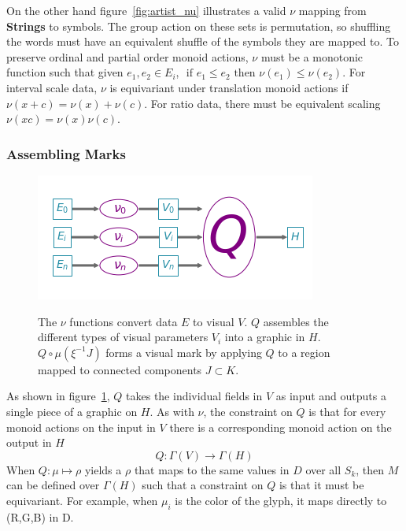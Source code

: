 \documentclass[../main.tex]{subfiles}
\begin{document}
On the other hand figure~\ref{fig:artist_nu} illustrates a valid $\nu$ mapping from \textbf{Strings} to symbols. The group action on these sets is permutation, so shuffling the words must have an equivalent shuffle of the symbols they are mapped to. To preserve ordinal and partial order monoid actions, $\nu$ must be a monotonic function such that given $e_1, e_2 \in E_{i}$, $\text{ if } e_1 \leq e_2 \text{ then } \nu(e_1) \leq \nu(e_2)$. For interval scale data, $\nu$ is equivariant under translation monoid actions if $\nu(x + c) = \nu(x) + \nu(c)$. For ratio data, there must be equivalent scaling $ \nu(xc) = \nu(x)\nu(c)$.

\subsubsection{Assembling Marks}
\label{sec:artist_q}
\begin{figure}[H]
    \includegraphics[width=\textwidth]{figures/math/path_of_q}
    \label{fig:artist_q}
    \caption{The $\nu$ functions convert data $E$ to visual $V$. $Q$ assembles the different types of visual parameters $V_{i}$ into a graphic in $H$. $Q\circ\mu(\xi^{-1}J)$ forms a visual mark by applying $Q$ to a region mapped to connected components $J \subset K$.}
\end{figure}

As shown in figure~\ref{fig:artist_q}, $Q$ takes the individual fields in $V$ as input and outputs a single piece of a graphic on $H$. As with $\nu$, the constraint on $Q$ is that for every monoid actions on the input in $V$ there is a corresponding monoid action on the output in $H$
\begin{equation}
    Q: \Gamma(V) \rightarrow \Gamma(H)
\end{equation}
When $Q: \mu \mapsto \rho$ yields a $\rho$ that maps to the same values in $D$ over all $S_k$, then $M$ can be defined over $\Gamma(H)$ such that a constraint on $Q$ is that it must be equivariant. For example, when $\mu_{i}$ is the color of the glyph, it maps directly to (R,G,B) in D.
\end{document}
